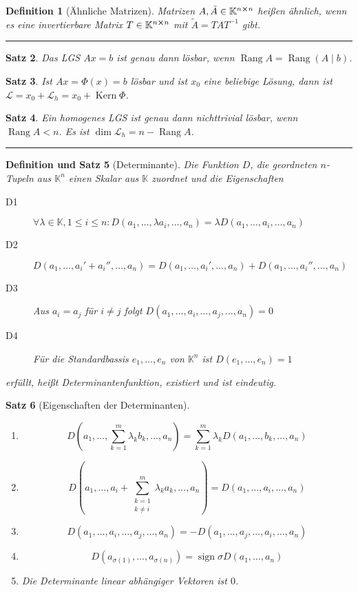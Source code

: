 \documentclass[a4paper]{article}
\newcounter{Sec}
\theoremstyle{marginbreak}
\newtheorem{definition}{Definition}[Sec]
\newtheorem{satz}[definition]{Satz}
\newtheorem{defsatz}[definition]{Definition und Satz}
\DeclareMathOperator{\Kern}{Kern}
\DeclareMathOperator{\Rang}{Rang}
\DeclareMathOperator{\sign}{sign}
\newcommand{\sep}{%
	\rule{\textwidth}{0.3pt}%
	\stepcounter{Sec}%
	}
\begin{document}
	\begin{definition}[Ähnliche Matrizen]
		Matrizen $A, \tilde{A} \in \mathbb{K}^{n\cross n}$ heißen ähnlich, wenn es eine
		invertierbare Matrix $T\in \mathbb{K}^{n\cross n}$ mit $\tilde{A} = TAT^{-1}$ gibt.
	\end{definition}
	\sep
	\begin{satz}
		Das LGS $Ax = b$ ist genau dann lösbar, wenn $\Rang A = \Rang(A \mid b)$.
	\end{satz}
	\begin{satz}
		Ist $Ax = \Phi(x) = b$ lösbar und ist $x_0$ eine beliebige Lösung, dann
		ist $\mathcal{L} = x_0 + \mathcal{L}_h = x_0 + \Kern\Phi$.
	\end{satz}
	\begin{satz}
		Ein homogenes LGS ist genau dann nichttrivial lösbar, wenn $\Rang A < n$.
		Es ist $\dim\mathcal{L}_h = n - \Rang A$.
	\end{satz}
	\sep
	\begin{defsatz}[Determinante]
		Die Funktion $D$, die geordneten $n$-Tupeln aus $\mathbb{K}^n$ einen Skalar aus
		$\mathbb{K}$ zuordnet und die Eigenschaften
		\begin{description}
			\item[D1] $\forall\lambda\in\mathbb{K},1\leq i\leq n: D(a_1,\ldots,\lambda a_i,\ldots,a_n) = \lambda D(a_1,\ldots,a_i,\ldots,a_n)$
			\item[D2] $D(a_1,\ldots,a_i'+a_i'',\ldots,a_n) = D(a_1,\ldots,a_i',\ldots,a_n) + D(a_1,\ldots,a_i'',\ldots,a_n)$
			\item[D3] Aus $a_i = a_j$ für $i \neq j$ folgt $D(a_1,\ldots,a_i,\ldots,a_j,\ldots,a_n) = 0$
			\item[D4] Für die Standardbassis $e_1,\ldots,e_n$ von $\mathbb{K}^n$ ist $D(e_1,\ldots,e_n) = 1$
		\end{description}
		erfüllt, heißt Determinantenfunktion, existiert und ist eindeutig.
	\end{defsatz}
	\begin{satz}[Eigenschaften der Determinanten]
		\begin{enumerate}[label=(\alph*)]
			\item
				\[ D(a_1,\ldots,\sum_{k=1}^m\lambda_kb_k,\ldots,a_n)=\sum_{k=1}^m\lambda_kD(a_1,\ldots,b_k,\ldots,a_n) \]
			\item
				\[ D(a_1,\ldots,a_i+\sum_{\substack{k=1\\k\neq i}}^m\lambda_ka_k,\ldots,a_n) = D(a_1,\ldots,a_i,\ldots,a_n) \]
			\item
				\[ D(a_1,\ldots,a_i,\ldots,a_j,\ldots,a_n) = -D(a_1,\ldots,a_j,\ldots,a_i,\ldots,a_n) \]
			\item
				\[ D(a_{\sigma(1)},\ldots,a_{\sigma(n)}) = \sign\sigma D(a_1,\ldots,a_n) \]
			\item Die Determinante linear abhängiger Vektoren ist $0$.
		\end{enumerate}
	\end{satz}
\end{document}

